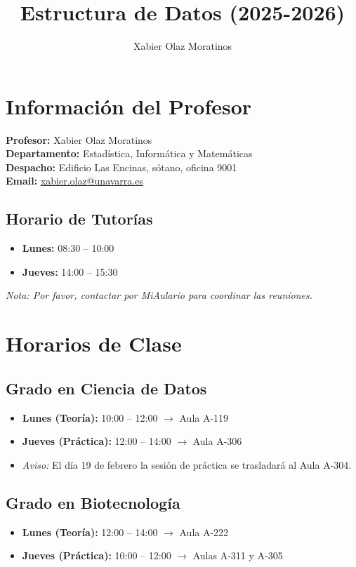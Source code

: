 \documentclass[spanish,12pt,a4paper]{article}
\title{Estructura de Datos (2025-2026)}
\author{Xabier Olaz Moratinos}
\date{}
\begin{document}
\maketitle

\section*{Informaci\'{o}n del Profesor}
\textbf{Profesor:} Xabier Olaz Moratinos \\
\textbf{Departamento:} Estad\'{i}stica, Inform\'{a}tica y Matem\'{a}ticas \\
\textbf{Despacho:} Edificio Las Encinas, s\'{o}tano, oficina 9001 \\
\textbf{Email:} \href{mailto:xabier.olaz@unavarra.es}{xabier.olaz@unavarra.es}

\subsection*{Horario de Tutor\'{i}as}
\begin{itemize}
    \item \textbf{Lunes:} 08:30 -- 10:00
    \item \textbf{Jueves:} 14:00 -- 15:30
\end{itemize}
\textit{Nota: Por favor, contactar por MiAulario para coordinar las reuniones.}

\section*{Horarios de Clase}

\subsection*{Grado en Ciencia de Datos}
\begin{itemize}
    \item \textbf{Lunes (Teor\'{i}a):} 10:00 -- 12:00 $\rightarrow$ Aula A-119
    \item \textbf{Jueves (Pr\'{a}ctica):} 12:00 -- 14:00 $\rightarrow$ Aula A-306
    \item \textit{Aviso:} El d\'{i}a 19 de febrero la sesi\'{o}n de pr\'{a}ctica se trasladar\'{a} al Aula A-304.
\end{itemize}

\subsection*{Grado en Biotecnolog\'{i}a}
\begin{itemize}
    \item \textbf{Lunes (Teor\'{i}a):} 12:00 -- 14:00 $\rightarrow$ Aula A-222
    \item \textbf{Jueves (Pr\'{a}ctica):} 10:00 -- 12:00 $\rightarrow$ Aulas A-311 y A-305
\end{itemize}
\end{document}
